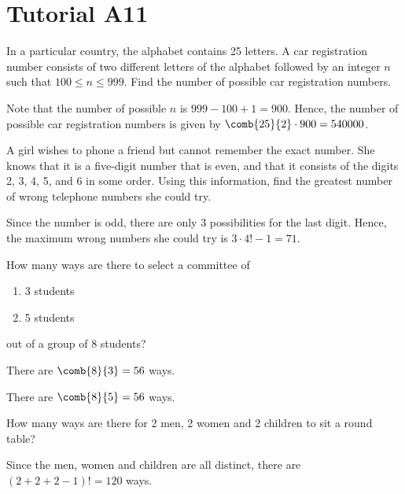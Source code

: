 \section{Tutorial A11}

\begin{problem}
    In a particular country, the alphabet contains 25 letters. A car registration number consists of two different letters of the alphabet followed by an integer $n$ such that $100 \leq n \leq 999$. Find the number of possible car registration numbers.
\end{problem}
\begin{solution}
    Note that the number of possible $n$ is $999 - 100 + 1 = 900$. Hence, the number of possible car registration numbers is given by $\comb{25}{2} \cdot 900 = 540 000$.
\end{solution}

\begin{problem}
    A girl wishes to phone a friend but cannot remember the exact number. She knows that it is a five-digit number that is even, and that it consists of the digits 2, 3, 4, 5, and 6 in some order. Using this information, find the greatest number of wrong telephone numbers she could try.
\end{problem}
\begin{solution}
    Since the number is odd, there are only 3 possibilities for the last digit. Hence, the maximum wrong numbers she could try is $3 \cdot 4! - 1 = 71$.
\end{solution}

\begin{problem}
    How many ways are there to select a committee of
    \begin{enumerate}
        \item 3 students
        \item 5 students
    \end{enumerate}
    out of a group of 8 students?
\end{problem}
\begin{solution}
    \begin{ppart}
        There are $\comb{8}{3} = 56$ ways.
    \end{ppart}
    \begin{ppart}
        There are $\comb{8}{5} = 56$ ways.
    \end{ppart}
\end{solution}

\begin{problem}
    How many ways are there for 2 men, 2 women and 2 children to sit a round table?
\end{problem}
\begin{solution}
    Since the men, women and children are all distinct, there are $(2 + 2 + 2 - 1)! = 120$ ways.
\end{solution}

